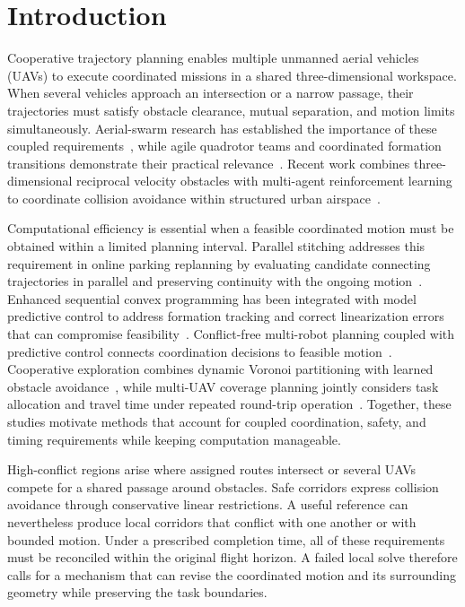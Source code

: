 \section{Introduction}
Cooperative trajectory planning enables multiple unmanned aerial vehicles (UAVs) to execute coordinated missions in a shared three-dimensional workspace. When several vehicles approach an intersection or a narrow passage, their trajectories must satisfy obstacle clearance, mutual separation, and motion limits simultaneously. Aerial-swarm research has established the importance of these coupled requirements~\cite{chung2018}, while agile quadrotor teams and coordinated formation transitions demonstrate their practical relevance~\cite{kushleyev2012,preiss2017}. Recent work combines three-dimensional reciprocal velocity obstacles with multi-agent reinforcement learning to coordinate collision avoidance within structured urban airspace~\cite{zhong2025rvo}.

Computational efficiency is essential when a feasible coordinated motion must be obtained within a limited planning interval. Parallel stitching addresses this requirement in online parking replanning by evaluating candidate connecting trajectories in parallel and preserving continuity with the ongoing motion~\cite{li2022stitching}. Enhanced sequential convex programming has been integrated with model predictive control to address formation tracking and correct linearization errors that can compromise feasibility~\cite{liu2025escp}. Conflict-free multi-robot planning coupled with predictive control connects coordination decisions to feasible motion~\cite{wu2025conflict}. Cooperative exploration combines dynamic Voronoi partitioning with learned obstacle avoidance~\cite{zhao2025exploration}, while multi-UAV coverage planning jointly considers task allocation and travel time under repeated round-trip operation~\cite{li2025coverage}. Together, these studies motivate methods that account for coupled coordination, safety, and timing requirements while keeping computation manageable.

High-conflict regions arise where assigned routes intersect or several UAVs compete for a shared passage around obstacles. Safe corridors express collision avoidance through conservative linear restrictions. A useful reference can nevertheless produce local corridors that conflict with one another or with bounded motion. Under a prescribed completion time, all of these requirements must be reconciled within the original flight horizon. A failed local solve therefore calls for a mechanism that can revise the coordinated motion and its surrounding geometry while preserving the task boundaries.

